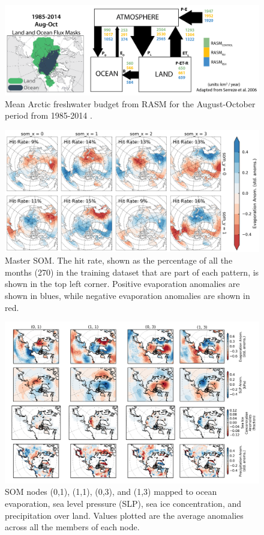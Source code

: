 \documentclass[draft,linenumbers]{agujournal}
\begin{document}
\clearpage
\begin{figure}
  \centering
  \includegraphics[width=14cm,keepaspectratio]{fresh_water_budget}
  \caption{Mean Arctic freshwater budget from RASM for the August-October period from 1985-2014 \citep[adapted from][]{Serreze_2006a}.}
  \label{fig:fwb}
\end{figure}

\clearpage
\begin{figure}
  \centering
  \includegraphics[width=16cm,keepaspectratio]{master_som}
  \caption{Master SOM. The hit rate, shown as the percentage of all the months (270) in the training dataset that are part of each pattern, is shown in the top left corner. Positive evaporation anomalies are shown in blues, while negative evaporation anomalies are shown in red.}
  \label{fig:master_som}
\end{figure}

\clearpage
\begin{figure}
  \centering
  \includegraphics[width=16cm,keepaspectratio]{composite_som}
  \caption{SOM nodes (0,1), (1,1), (0,3), and (1,3) mapped to ocean evaporation, sea level pressure (SLP), sea ice concentration, and precipitation over land. Values plotted are the average anomalies across all the members of each node.}
  \label{fig:composite_som}
\end{figure}
\end{document}
